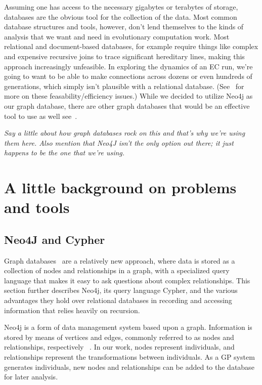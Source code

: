 
Assuming one has access to the necessary gigabytes or terabytes of storage, 
databases are the obvious tool for the collection of the data. Most common database structures and tools,
however,
don't lend themselves to the kinds of analysis that we want and need in evolutionary computation work. Most relational and document-based databases, for example require things like complex and expensive 
recursive joins to trace significant hereditary lines, making this approach increasingly unfeasible.
 In exploring the dynamics of an EC run, we're going to want to be able to
make connections across dozens or even hundreds of generations, which simply isn't plausible with a
relational database. (See~\cite{Robinson:GraphDB:Book} for more on these 
feasability/efficiency issues.) While we decided to utilize Neo4j as our graph database, there are other graph databases that would be an effective tool to use as well see~\cite{wiki:GraphDB}. 

\emph{Say a little about how graph databases rock on this and that's why we're using them here. Also
	mention that Neo4J isn't the only option out there; it just happens to be the one that we're
	using.}

\section{A little background on problems and tools}

\subsection{Neo4J and Cypher}
\label{subsec:Neo4j}
Graph databases~%
 are a relatively new approach, where data is stored as a collection of nodes and relationships in a graph, with a specialized query language that makes it easy to ask questions about complex relationships. This section further describes Neo4j, its query language Cypher, and the various advantages they hold over relational databases in recording and accessing information that relies heavily on recursion.

Neo4j is a form of data management system based upon a graph. Information is stored by means of vertices and edges, commonly referred to as nodes and relationships, respectively~%
. In our work, nodes represent individuals, and relationships represent the transformations between individuals. As a GP system generates individuals, new nodes and relationships can be added to the database for later analysis.

